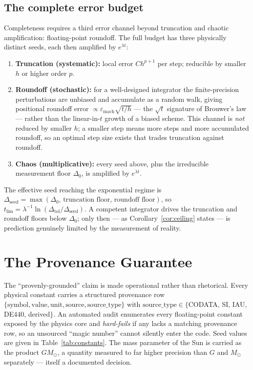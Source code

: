 \documentclass[11pt]{article}
\theoremstyle{definition}
\begin{document}
\subsection{The complete error budget}
\label{sec:budget}
Completeness requires a third error channel beyond truncation and chaotic
amplification: floating-point roundoff. The full budget has three physically
distinct seeds, each then amplified by $e^{\lambda t}$:
\begin{enumerate}
  \item \textbf{Truncation (systematic):} local error $Ch^{p+1}$ per step;
  reducible by smaller $h$ or higher order $p$.
  \item \textbf{Roundoff (stochastic):} for a well-designed integrator the
  finite-precision perturbations are unbiased and accumulate as a random walk,
  giving positional roundoff error $\propto \varepsilon_{\mathrm{mach}}
  \sqrt{t/h}$ --- the $\sqrt{t}$ signature of Brouwer's law
  \cite{brouwer1937} --- rather than the linear-in-$t$ growth of a biased
  scheme. This channel is \emph{not} reduced by smaller $h$; a smaller step
  means more steps and more accumulated roundoff, so an optimal step size
  exists that trades truncation against roundoff.
  \item \textbf{Chaos (multiplicative):} every seed above, plus the irreducible
  measurement floor $\Delta_0$, is amplified by $e^{\lambda t}$.
\end{enumerate}
The effective seed reaching the exponential regime is
$\Delta_{\mathrm{seed}} = \max(\Delta_0,\,\text{truncation floor},\,\text{roundoff
floor})$, so $t_{\mathrm{lim}} = \lambda^{-1}\ln(\Delta_{\mathrm{tol}}/
\Delta_{\mathrm{seed}})$. A competent integrator drives the truncation and
roundoff floors below $\Delta_0$; only then --- as Corollary~\ref{cor:ceiling}
states --- is prediction genuinely limited by the measurement of reality.

\section{The Provenance Guarantee}
\label{sec:provenance}

The ``provenly-grounded'' claim is made operational rather than rhetorical.
Every physical constant carries a structured provenance row
$\{\text{symbol}, \text{value}, \text{unit}, \text{source}, \text{source\_type}\}$
with $\text{source\_type} \in \{$CODATA, SI, IAU, DE440, derived$\}$. An
automated audit enumerates every floating-point constant exposed by the physics
core and \emph{hard-fails} if any lacks a matching provenance row, so an
unsourced ``magic number'' cannot silently enter the code. Seed values are given
in Table~\ref{tab:constants}. The mass parameter of the Sun is carried as the
product $GM_\odot$, a quantity measured to far higher precision than $G$ and
$M_\odot$ separately --- itself a documented decision.
\end{document}
